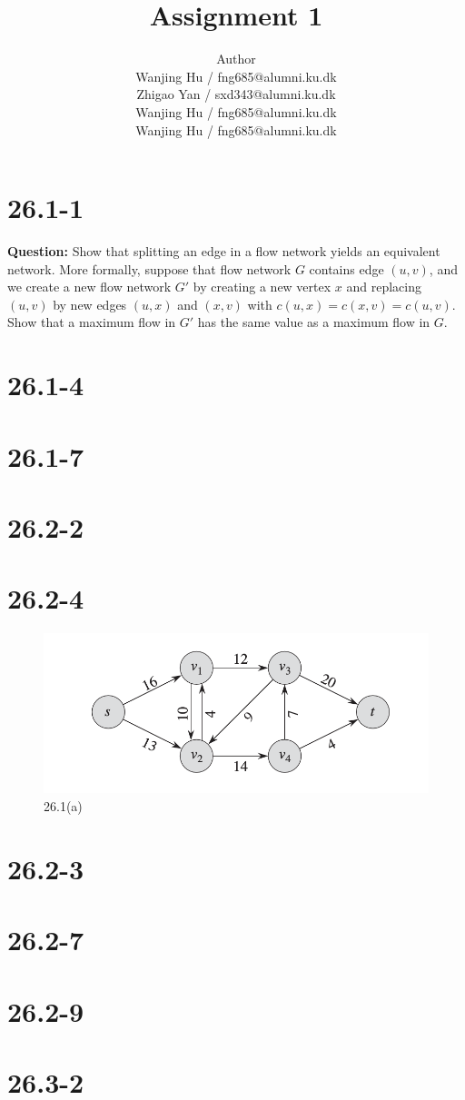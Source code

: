 \documentclass[12pt]{article}
\title{Assignment 1}
\author{Author \\
  Wanjing Hu / fng685@alumni.ku.dk  \\
  Zhigao Yan / sxd343@alumni.ku.dk  \\
  Wanjing Hu / fng685@alumni.ku.dk  \\
  Wanjing Hu / fng685@alumni.ku.dk  \\
}
\begin{document}
\maketitle


\section{26.1-1}
\textbf{Question: }Show that splitting an edge in a flow network yields an equivalent network. More formally, suppose that flow network $G$ contains edge $(u, v)$, and we create a new flow network $G'$ by creating a new vertex $x$ and replacing $(u, v)$ by new edges $(u, x)$ and $(x, v)$ with $c(u, x) = c(x, v) = c(u, v)$. Show that a maximum flow in $G'$ has the same value as a maximum flow in $G$.

\section{26.1-4}

\section{26.1-7}

\section{26.2-2}
\section{26.2-4}

\begin{figure}[h]
    \centering
    \includegraphics[width=0.5\linewidth]{截屏2024-11-18 下午7.32.25.png}
    \caption{26.1(a)}
    \label{fig:enter-label}
\end{figure}
\section{26.2-3}
\section{26.2-7}
\section{26.2-9}
\section{26.3-2}
\end{document}
